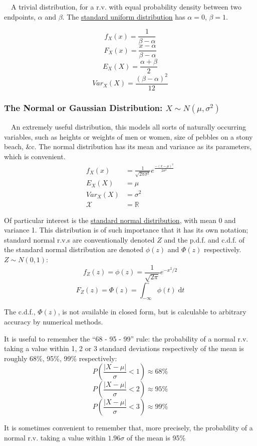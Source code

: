 \documentclass[12pt,a4paper]{article}
\begin{document}
$\quad$A trivial distribution, for a r.v. with equal probability density between two endpoints, $\alpha$ and $\beta$. The \underline{standard uniform distribution} has $\alpha = 0$, $\beta = 1$.

$$f_X(x) = \frac{1}{\beta-\alpha}$$
$$F_X(x) = \frac{x-\alpha}{\beta-\alpha}$$
$$E_{X}(X) = \frac{\alpha+\beta}{2}$$
$$Var_{X}(X) = \frac{(\beta-\alpha)^2}{12}$$

\subsubsection{The Normal or Gaussian Distribution: $X \sim N(\mu, \sigma^2)$}

$\quad$An extremely useful distribution, this models all sorts of naturally occurring variables, such as heights or weights of men or women, size of pebbles on a stony beach, \&c. The normal distribution has its mean and variance as its parameters, which is convenient.
\begin{align*}
f_X(x) &= \frac{1}{\sqrt{2\pi\sigma^2}}e^{\frac{-(x-\mu)^2}{2\sigma^2}}\\
E_{X}(X) &= \mu\\
Var_{X}(X) &= \sigma^2\\
\mathcal{X} &= \mathbb{R}
\end{align*}

Of particular interest is the \underline{standard normal distribution}, with mean 0 and variance 1. This distribution is of such importance that it has its own notation; standard normal r.v.s are conventionally denoted $Z$ and the p.d.f. and c.d.f. of the standard normal distribution are denoted $\phi(z)$ and $\Phi(z)$ respectively. $Z \sim N(0,1)$:
$$f_Z(z) = \phi(z) = \frac{1}{\sqrt{2\pi}}e^{-x^2/2}$$
$$F_Z(z) = \Phi(z) = \int_{-\infty}^{z} \!\phi(t)\; \mathrm{d}t$$

The c.d.f., $\Phi(z)$, is not available in closed form, but is calculable to arbitrary accuracy by numerical methods.

It is useful to remember the ``68 - 95 - 99'' rule: the probability of a normal r.v. taking a value within 1, 2 or 3 standard deviations respectively of the mean is roughly 68\%, 95\%, 99\% respectively:
$$P\left( \frac{|X-\mu|}{\sigma}< 1\right) \approx 68\%$$
$$P\left( \frac{|X-\mu|}{\sigma} < 2\right) \approx 95\%$$
$$P\left( \frac{|X-\mu|}{\sigma} < 3\right) \approx 99\%$$

It is sometimes convenient to remember that, more precisely, the probability of a normal r.v. taking a value within $1.96\sigma$ of the mean is 95\%
\end{document}
